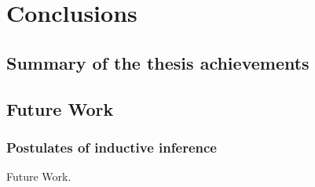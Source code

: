 \chapter{Conclusions}

\label{ch:conclusions}

\section{Summary of the thesis achievements}


\section{Future Work}

\subsection{Postulates of inductive inference}

Future Work.
